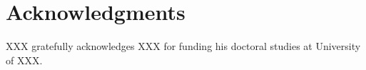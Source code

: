 \documentclass{sigchi}
\begin{document}
\section{Acknowledgments}

XXX gratefully acknowledges XXX for funding his doctoral studies at
University of XXX.

%
%
%
%
%


\balance{}



\end{document}
